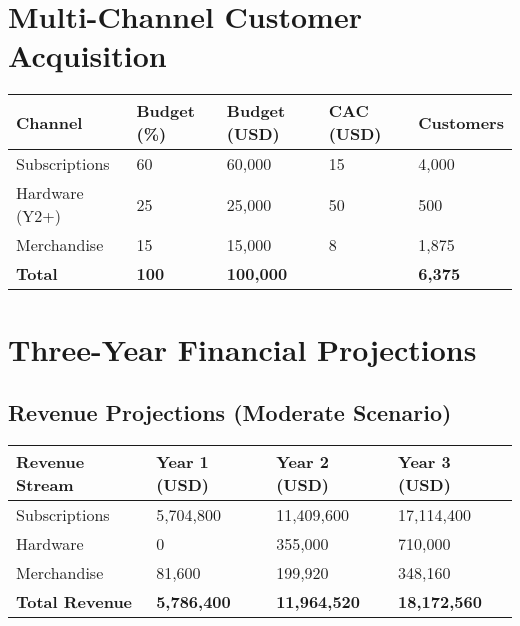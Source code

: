 \documentclass[11pt]{article}
\begin{document}
\section{Multi-Channel Customer Acquisition}

\begin{table}[htbp]
\centering
\begin{tabularx}{\linewidth}{l Y Y Y Y}
\toprule
Channel & Budget (\%) & Budget (USD) & CAC (USD) & Customers \\\midrule
Subscriptions & 60 & 60,000 & 15 & 4,000 \\
Hardware (Y2+) & 25 & 25,000 & 50 & 500 \\
Merchandise & 15 & 15,000 & 8 & 1,875 \\\midrule
\textbf{Total} & \textbf{100} & \textbf{100,000} &  & \textbf{6,375} \\
\bottomrule
\end{tabularx}
\end{table}

\section{Three-Year Financial Projections}

\subsection{Revenue Projections (Moderate Scenario)}
\begin{table}[htbp]
\centering
\begin{tabularx}{\linewidth}{l Y Y Y}
\toprule
Revenue Stream & Year 1 (USD) & Year 2 (USD) & Year 3 (USD) \\\midrule
Subscriptions & 5,704,800 & 11,409,600 & 17,114,400 \\
Hardware & 0 & 355,000 & 710,000 \\
Merchandise & 81,600 & 199,920 & 348,160 \\\midrule
\textbf{Total Revenue} & \textbf{5,786,400} & \textbf{11,964,520} & \textbf{18,172,560} \\
\bottomrule
\end{tabularx}
\end{table}
\end{document}
